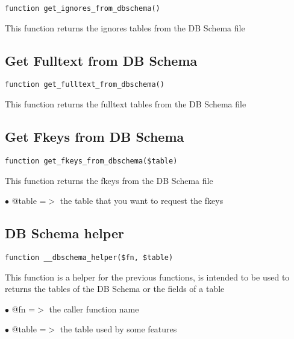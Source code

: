 \documentclass[a4paper]{book}
\begin{document}
\begin{lstlisting}
function get_ignores_from_dbschema()
\end{lstlisting}

This function returns the ignores tables from the DB Schema file

\hypertarget{toc93}{}
\subsection{Get Fulltext from DB Schema}

\begin{lstlisting}
function get_fulltext_from_dbschema()
\end{lstlisting}

This function returns the fulltext tables from the DB Schema file

\hypertarget{toc94}{}
\subsection{Get Fkeys from DB Schema}

\begin{lstlisting}
function get_fkeys_from_dbschema($table)
\end{lstlisting}

This function returns the fkeys from the DB Schema file

\begin{compactitem}
\item[\color{myblue}$\bullet$] @table =$>$ the table that you want to request the fkeys
\end{compactitem}

\hypertarget{toc95}{}
\subsection{DB Schema helper}

\begin{lstlisting}
function __dbschema_helper($fn, $table)
\end{lstlisting}

This function is a helper for the previous functions, is intended to be used
to returns the tables of the DB Schema or the fields of a table

\begin{compactitem}
\item[\color{myblue}$\bullet$] @fn    =$>$ the caller function name
\item[\color{myblue}$\bullet$] @table =$>$ the table used by some features
\end{compactitem}
\end{document}
